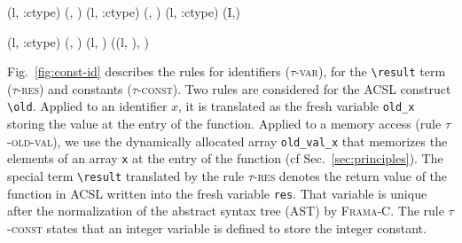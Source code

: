 \begin{figure*}[t]
\scriptsize{
  {
    {(l, :ctype)  (\emptyset, )}
  }
  {
    {(l, :ctype)  (\emptyset, )}
  }
  {
    {(l, :ctype)  (I,)}
  }
  \vspace{-7mm}

  {
    {(l, :ctype)  (\emptyset, )}
  }
  {
    {
      (l, )
      ((l,
      \underline{\Zinit{}}
      ), )}
  }
}
  \vspace{-5mm}
  \caption{Translation rules for constants, identifiers, and
    \textbf{$\backslash$\lstinline{old}} terms}
  \label{fig:const-id}
\vspace{-4mm}
\end{figure*}



Fig.~\ref{fig:const-id} describes the rules for identifiers
(\textsc{$\tau$-var}), for the \lstinline|\result| term
(\textsc{$\tau$-res}) and constants (\textsc{$\tau$-const}).
Two rules are considered for the ACSL construct \lstinline|\old|.
Applied to an identifier $x$, it is translated as the fresh variable
\lstinline|old_x| storing the value at the entry of the function.
Applied to a memory access (rule \textsc{$\tau$-old-val}), we use the dynamically
allocated array \lstinline|old_val_x| that memorizes the elements of an array
\lstinline|x| at the entry of the function (cf Sec.~\ref{sec:principles}).
The special term \lstinline|\result| translated by the rule
\textsc{$\tau$-res} denotes the return value of the function in
\textsc{ACSL} written into the fresh variable   \lstinline|res|.
That variable is unique after the normalization of the abstract syntax tree (AST) by
\textsc{Frama-C}. 
The rule \textsc{$\tau$-const} states that an integer variable is defined to
store the integer constant.


